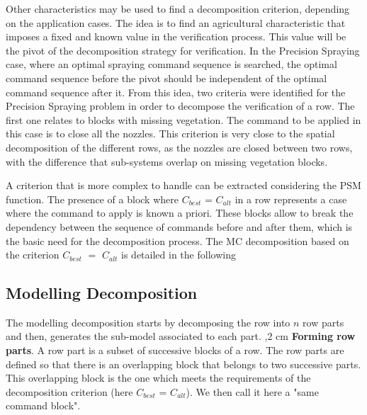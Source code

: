 Other characteristics may be used to find a decomposition criterion, depending on the application cases. The idea is to find an agricultural characteristic that imposes a fixed and known value in the verification process. This value will be the pivot of the decomposition strategy for verification.
In the Precision Spraying case, where an optimal spraying command sequence is searched, the optimal command sequence before the pivot should be independent of the optimal command sequence after it. From this idea, two criteria were identified for the Precision Spraying problem in order to decompose the verification of a row.
The first one relates to blocks with missing vegetation. The command to be applied in this case is to close all the nozzles. This criterion is very close to the spatial decomposition of the different rows, as the nozzles are closed between two rows, with the difference that sub-systems overlap on missing vegetation blocks.

A criterion that is more complex to handle can be extracted considering the PSM function.
The presence of a block where $C_{best}$ = $C_{alt}$ in a row represents a case where the command to apply is known a priori. These blocks allow to break the dependency between the sequence of commands before and after them, which is the basic need for the decomposition process. The MC decomposition based on the criterion $C_{best}$ $=$ $C_{alt}$ is detailed in the following


\subsection{Modelling Decomposition}
\label{MD}

The modelling decomposition starts by decomposing the row into $n$ row parts and then, generates the sub-model associated to each part. 
,2 cm 
\textbf{Forming row parts}. A row part is a subset of successive blocks of a row. %
The row parts are defined so that there is an overlapping block that belongs to two successive parts. This overlapping block is the one which meets the requirements of the decomposition criterion (here $C_{best}$ = $C_{alt}$). We then call it here a "same command block".

